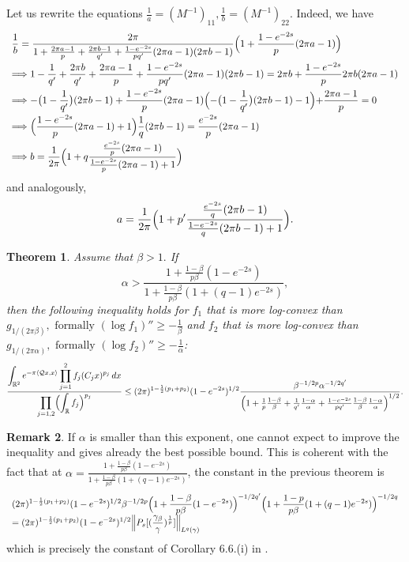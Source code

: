 \documentclass[11pt,a4paper,reqno]{amsart}
\numberwithin{equation}{section}
\newtheorem{theorem}{Theorem}[section]
\theoremstyle{definition}
\newtheorem{remark}[theorem]{Remark}
\newcommand{\nm}{\noalign{\smallskip}}
\newcommand{\ds}{\displaystyle}
\newcommand{\<}{\ensuremath \leq}
\renewcommand{\>}{\ensuremath \geq}
\begin{document}
Let us rewrite the equations $\frac{1}{a}=(M^{-1})_{11}, \frac{1}{b}=(M^{-1})_{22}.$ Indeed, we have $$\begin{array}{lll}
\ds \frac{1}{b}=\frac{2\pi}{1+\frac{2\pi a-1}{p}+\frac{2\pi b-1}{q'}+\frac{1-e^{-2s}}{pq'}(2\pi a-1)(2\pi b-1)}\Bigl( 1+\frac{1-e^{-2s}}{p}(2\pi a-1)\Bigl) \\
\nm 
\Longrightarrow \ds 1-\frac{1}{q'}+\frac{2\pi b}{q'}+\frac{2\pi a-1}{p}+\frac{1-e^{-2s}}{pq'}(2\pi a-1)(2\pi b-1)=2\pi b+\frac{1-e^{-2s}}{p}2\pi b(2\pi a-1) \\
\nm 
\Longrightarrow \ds -\bigl(1-\frac{1}{q'}\bigl)(2\pi b-1)+\frac{1-e^{-2s}}{p}(2\pi a-1)\Bigl( -\bigl(1-\frac{1}{q'}\bigl)(2\pi b-1)-1\Bigl) +\frac{2\pi a-1}{p}=0 \\
\nm 
\Longrightarrow \ds \Bigl( \frac{1-e^{-2s}}{p}(2\pi a-1)+1 \Bigl) \frac{1}{q}(2\pi b-1)=\frac{e^{-2s}}{p}(2\pi a-1) \\
\nm 
\Longrightarrow \ds b=\frac{1}{2\pi}\Bigl(1 +q\frac{\frac{e^{-2s}}{p}(2\pi a-1)}{\frac{1-e^{-2s}}{p}(2\pi a-1)+1}\Bigl)
\end{array}$$ and analogously, $$a=\frac{1}{2\pi} \Bigl( 1+p'\frac{\frac{e^{-2s}}{q}(2\pi b-1)}{\frac{1-e^{-2s}}{q}(2\pi b-1)+1}\Bigl).$$



\begin{theorem}
Assume that $\beta>1.$ If $$\alpha>\frac{1+\frac{1-\beta}{p\beta}(1-e^{-2s})}{1+\frac{1-\beta}{p\beta}(1+(q-1)e^{-2s})},$$ then the following inequality holds for $f_1$ that is more log-convex than $g_{1/(2\pi\beta)}, \text{ formally } (\log f_1)'' \geq -\frac{1}{\beta}$ and $f_2$ that is more log-convex than $g_{1/(2\pi\alpha)}, \text{ formally } (\log f_2)'' \geq -\frac{1}{\alpha}$: $$\frac{\ds \int_{\mathbb{R}^2}e^{-\pi \langle \mathcal{Q}x,x\rangle}\prod_{j=1}^2 f_j(C_jx)^{p_j}\, dx}{\ds \prod_{j=1,2}\Bigl(\int_{\mathbb{R}} f_j\Bigl)^{p_j}} \leq (2\pi)^{1-\frac{1}{2}(p_1+p_2)}(1-e^{-2s})^{1/2}\frac{\beta^{-1/2p}\alpha^{-1/2q'}}{\Bigl(1+\frac{1}{p}\frac{1-\beta}{\beta}+\frac{1}{q'}\frac{1-\alpha}{\alpha}+\frac{1-e^{-2s}}{pq'}\frac{1-\beta}{\beta}\frac{1-\alpha}{\alpha}\Bigl)^{1/2}}.$$ 
\end{theorem}

\begin{remark}
    If $\alpha$ is smaller than this exponent, one cannot expect to improve the inequality and \cite[Corollary 6.6]{Nakamura_Tsuji} gives already the best possible bound. This is coherent with the fact that at $\alpha=\frac{1+\frac{1-\beta}{p\beta}(1-e^{-2s})}{1+\frac{1-\beta}{p\beta}(1+(q-1)e^{-2s})}$, the constant in the previous theorem is $$\begin{array}{lll}
    \ds (2\pi)^{1-\frac12 (p_1+p_2)}(1-e^{-2s})^{1/2}\beta^{-1/2p}\Bigl(1+\frac{1-\beta}{p\beta}(1-e^{-2s})\Bigl)^{-1/2q'}\Bigl( 1+\frac{1-p}{p\beta}(1+(q-1)e^{-2s}) \Bigl)^{-1/2q} \\
    \ds = (2\pi)^{1-\frac12 (p_1+p_2)}(1-e^{-2s})^{1/2}\Bigl\|P_s[(\frac{\gamma_\beta}{\gamma})^{\frac 1p}]\Bigl\|_{L^q(\gamma)}
    \end{array}$$ which is precisely the constant of Corollary 6.6.(i) in \cite{Nakamura_Tsuji}. 
\end{remark}
\end{document}
